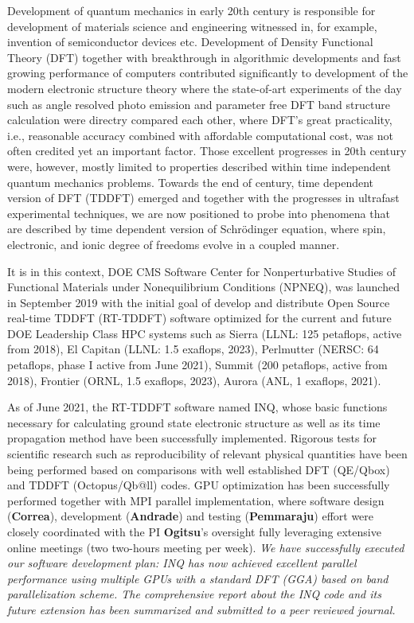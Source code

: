 Development of quantum mechanics in early 20th century is responsible for development of materials science and engineering witnessed in, for example, invention of semiconductor devices etc. Development of Density Functional Theory (DFT)\cite{HohenbergKohn1964,KohnSham1965} together with breakthrough in algorithmic developments\cite{cooley1965,Cohen1975,Hamann1979,CarParrinello1985,Martin1988,Hamann1989,Vanderbilt1990,Payne1992,Bloechl1994,Klesse1999} and fast growing performance of computers contributed significantly to development of the modern electronic structure theory where the state-of-art experiments of the day such as angle resolved photo emission and parameter free DFT band structure calculation were directry compared each other, where DFT's great practicality, i.e., reasonable accuracy combined with affordable computational cost, was not often credited yet an important factor. Those excellent progresses in 20th century were, however, mostly limited to properties described within time independent quantum mechanics problems. Towards the end of century, time dependent version of DFT (TDDFT) emerged \cite{RungeGross1984} and together with the progresses in ultrafast experimental techniques, we are now positioned to probe into phenomena that are described by time dependent version of Schr\"{o}dinger equation, where spin, electronic, and ionic degree of freedoms evolve in a coupled manner. 

It is in this context, DOE CMS Software Center for Nonperturbative Studies of Functional Materials under Nonequilibrium Conditions (NPNEQ), was launched in September 2019 with the initial goal of develop and distribute Open Source real-time TDDFT (RT-TDDFT) software optimized for the current and future DOE Leadership Class HPC systems such as Sierra (LLNL: 125 petaflops, active from 2018), El Capitan (LLNL: 1.5 exaflops, 2023), Perlmutter (NERSC: 64 petaflops, phase I active from June 2021), Summit (200 petaflops, active from 2018), Frontier (ORNL, 1.5 exaflops, 2023), Aurora (ANL, 1 exaflops, 2021). 

As of June 2021, the RT-TDDFT software named INQ, whose basic functions necessary for calculating ground state electronic structure as well as its time propagation method have been successfully implemented. Rigorous tests for scientific research such as reproducibility of relevant physical quantities have been being performed based on comparisons with well established DFT (QE/Qbox) and TDDFT (Octopus/Qb@ll) codes. GPU optimization has been successfully performed together with MPI parallel implementation, where software design ({\bf Correa}), development ({\bf Andrade}) and testing ({\bf Pemmaraju}) effort were closely coordinated with the PI {\bf Ogitsu}'s oversight fully leveraging extensive online meetings (two two-hours meeting per week). {\it We have successfully executed our software development plan: INQ has now achieved excellent parallel performance using multiple GPUs with a standard DFT (GGA) based on band parallelization scheme. The comprehensive report about the INQ code and its future extension has been summarized and submitted to a peer reviewed journal.}

